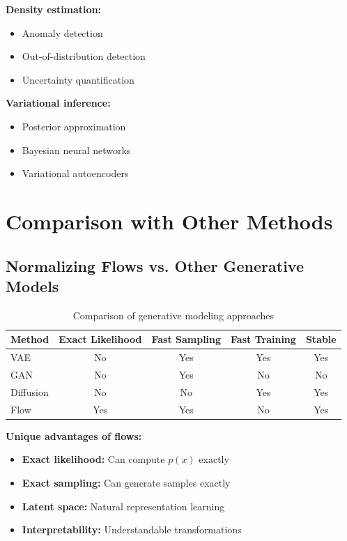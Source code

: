 \textbf{Density estimation:}
\begin{itemize}
    \item Anomaly detection
    \item Out-of-distribution detection
    \item Uncertainty quantification
\end{itemize}

\textbf{Variational inference:}
\begin{itemize}
    \item Posterior approximation
    \item Bayesian neural networks
    \item Variational autoencoders
\end{itemize}

\section{Comparison with Other Methods}

\subsection{Normalizing Flows vs. Other Generative Models}

\begin{table}[h]
\centering
\begin{tabular}{|l|c|c|c|c|}
\hline
Method & Exact Likelihood & Fast Sampling & Fast Training & Stable \\
\hline
VAE & No & Yes & Yes & Yes \\
GAN & No & Yes & No & No \\
Diffusion & No & No & Yes & Yes \\
Flow & Yes & Yes & No & Yes \\
\hline
\end{tabular}
\caption{Comparison of generative modeling approaches}
\end{table}

\textbf{Unique advantages of flows:}
\begin{itemize}
    \item \textbf{Exact likelihood:} Can compute $p(x)$ exactly
    \item \textbf{Exact sampling:} Can generate samples exactly
    \item \textbf{Latent space:} Natural representation learning
    \item \textbf{Interpretability:} Understandable transformations
\end{itemize}

